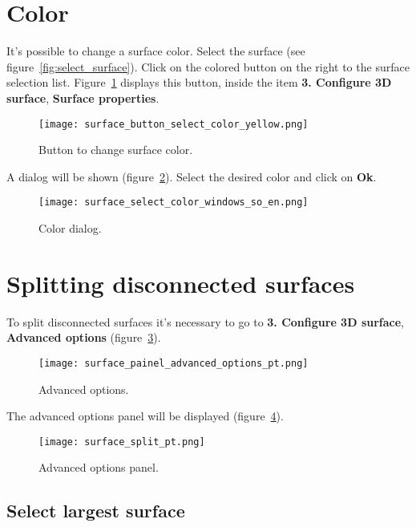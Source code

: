 \newpage

\section{Color}

It's possible to change a surface color. Select the surface (see figure~\ref{fig:select_surface}). Click on the colored button on the right to the surface selection list. Figure~\ref{fig:change_surface_color} displays this button, inside the item \textbf{3. Configure 3D surface}, \textbf{Surface properties}.

\begin{figure}[!htb]
\centering
\texttt{[image: surface\_button\_select\_color\_yellow.png]}
\caption{Button to change surface color.}
\label{fig:change_surface_color}
\end{figure}

A dialog will be shown (figure~\ref{fig:button_select_color}). Select the desired color and click on \textbf{Ok}.

\begin{figure}[!htb]
\centering
\texttt{[image: surface\_select\_color\_windows\_so\_en.png]}
\caption{Color dialog.}
\label{fig:button_select_color}
\end{figure}

\section{Splitting disconnected surfaces}

To split disconnected surfaces it's necessary to go to \textbf{3. Configure 3D surface}, \textbf{Advanced options} (figure~\ref{fig:advanced_tools}).

\begin{figure}[!htb]
\centering
\texttt{[image: surface\_painel\_advanced\_options\_pt.png]}
\caption{Advanced options.}
\label{fig:advanced_tools}
\end{figure}

\newpage

The advanced options panel will be displayed (figure~\ref{fig:advanced_tools_expanded}).

\begin{figure}[!htb]
\centering
\texttt{[image: surface\_split\_pt.png]}
\caption{Advanced options panel.}
\label{fig:advanced_tools_expanded}
\end{figure}

\subsection{Select largest surface}

